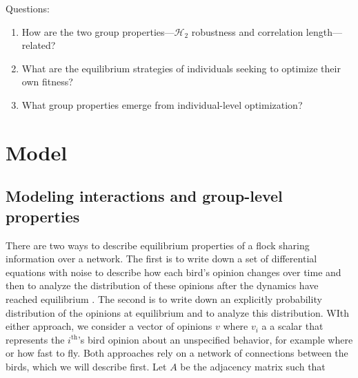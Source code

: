 \documentclass{article}
\begin{document}
%
%
%
%
%
%
%
Questions:
\begin{enumerate}
\item How are the two group properties---$\mathscr{H}_2$ robustness and correlation length---related?
\item What are the equilibrium strategies of individuals seeking to optimize their own fitness?
\item What group properties emerge from individual-level optimization?
\end{enumerate}


\section{Model }

\subsection{Modeling interactions and group-level properties }
There are two ways to describe equilibrium properties of a flock sharing information over a network.  The first is to write down a set of differential equations with noise to describe how each bird's opinion changes over time and then to analyze the distribution of these opinions after the dynamics have reached equilibrium \cite{Young:2010fk,Young:2013kx}. The second is to write down an explicitly probability distribution of the opinions at equilibrium and to analyze this distribution. WIth either approach, we consider a vector of opinions $v$ where $v_i$ a a scalar that represents the $i^\text{th}$'s bird opinion about an unspecified behavior, for example where or how fast to fly. Both approaches rely on a network of connections between the birds, which we will describe first. Let $A$ be the adjacency matrix such that 
\end{document}

